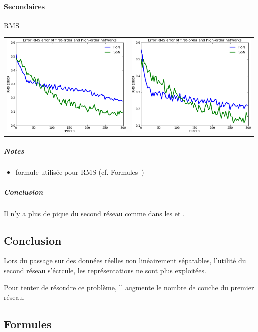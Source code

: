     \paragraph{Secondaires}
      RMS
      \begin{center}
	\begin{tabular}{lr}
	  \hspace*{-1cm}
	  \includegraphics[width=250px]{data/expC3/rms_5.png}
	  &
	  \includegraphics[width=250px]{data/expC3/rms_100.png} 
	\end{tabular}
      \end{center} 
      \subparagraph{Notes}
	\begin{itemize}
	  \item formule utilisée pour RMS (cf. Formules~)
	\end{itemize}
      \subparagraph{Conclusion}
	Il n'y a plus de pique du second réseau comme dans les  et .


  \subsection{Conclusion}
    Lors du passage sur des données réelles non linéairement séparables, l'utilité du second réseau
    s'écroule, les représentations ne sont plus exploitées.
    
    Pour tenter de résoudre ce problème, l' augmente le nombre de couche du premier réseau.

  \newpage 
  \subsection{Formules}
    
    
    


